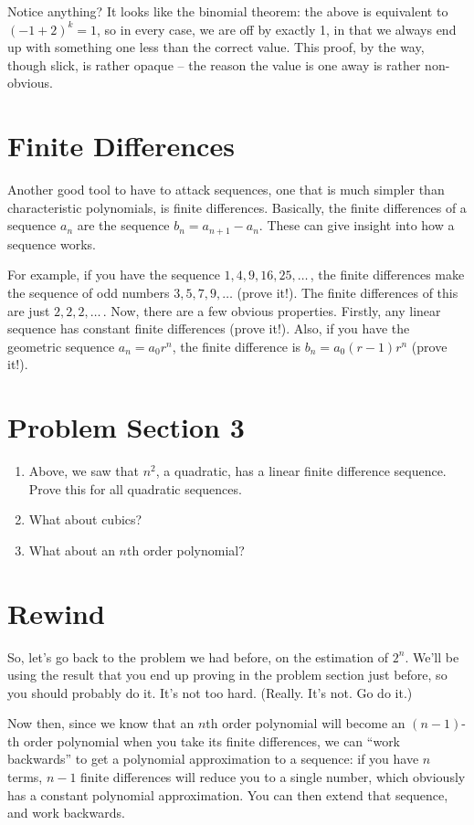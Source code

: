 \documentclass[12pt,letterpaper]{article}
\begin{document}
Notice anything? It looks like the binomial theorem: the above is equivalent to $(-1 + 2) ^ k = 1$,
so in every case, we are off by exactly 1, in that we always end up with something one less
than the correct value. This proof, by the way, though slick, is
rather opaque -- the reason the value is one away is rather non-obvious.

\section{Finite Differences}
Another good tool to have to attack sequences, one that is much
simpler than characteristic polynomials, is finite differences.
Basically, the finite differences of a sequence $a_n$ are the
sequence $b_n = a_{n+1} - a_n$. These can give insight into how a
sequence works.

For example, if you have the sequence $1, 4, 9, 16, 25, \ldots\,$, the
finite differences make the sequence of odd numbers $3, 5, 7, 9, \ldots$ (prove it!).
The finite differences of this are just $2, 2, 2, \ldots\,$. Now, there are
a few obvious properties. Firstly, any linear sequence has
constant finite differences (prove it!). Also, if you have the
geometric sequence $a_n = a_0 r^n$, the finite difference is
$b_n = a_0 (r-1) r^n$ (prove it!).

\section{Problem Section 3}
\begin{enumerate}
\item Above, we saw that $n^2$, a quadratic, has a linear finite difference
sequence. Prove this for all quadratic sequences.
\item What about cubics?
\item What about an $n$th order polynomial?
\end{enumerate}

\section{Rewind}
So, let's go back to the problem we had before, on the estimation of
$2^n$. We'll be using the result that you end up proving in the
problem section just before, so you should probably do it. It's not
too hard. (Really. It's not. Go do it.)

Now then, since we know that an $n$th order polynomial will become
an $(n-1)$-th order polynomial when you take its finite differences, we can
``work backwards'' to get a polynomial approximation to a sequence: if
you have $n$ terms, $n-1$ finite differences will reduce you to a
single number, which obviously has a constant polynomial
approximation. You can then extend that sequence, and work backwards.
\end{document}
